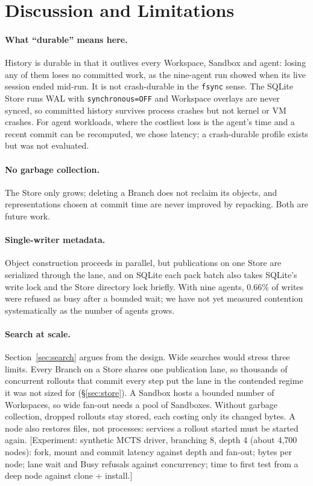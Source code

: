 \documentclass[letterpaper,twocolumn,10pt]{article}
\newif\ifdraft\drafttrue
\newcommand{\dnote}[1]{\ifdraft\textcolor{red!70!black}{\textsf{\small[#1]}}\fi}
\newcommand{\ws}{Workspace}
\begin{document}
\section{Discussion and Limitations}
\label{sec:discussion}

\paragraph{What ``durable'' means here.}\label{sec:durable} History is
durable in that it outlives every \ws{}, Sandbox and agent: losing any of
them loses no committed work, as the nine-agent run showed when its live
session ended mid-run. It is not crash-durable in the \texttt{fsync} sense.
The SQLite Store runs WAL with \texttt{synchronous=OFF} and \ws{} overlays
are never synced, so committed history survives process crashes but not
kernel or VM crashes. For agent workloads, where the costliest loss is the
agent's time and a recent commit can be recomputed, we chose latency; a
crash-durable profile exists but was not evaluated.

\paragraph{No garbage collection.} The Store only grows; deleting a Branch
does not reclaim its objects, and representations chosen at commit time are
never improved by repacking. Both are future work.

\paragraph{Single-writer metadata.} Object construction proceeds in
parallel, but publications on one Store are serialized through the lane,
and on SQLite each pack batch also takes SQLite's write lock and the Store
directory lock briefly. With
nine agents, 0.66\% of writes were refused as busy after a bounded wait; we
have not yet measured contention systematically as the number of agents
grows.

\paragraph{Search at scale.} Section~\ref{sec:search} argues from the
design. Wide searches would stress three limits. Every Branch on a Store
shares one publication lane, so thousands of concurrent rollouts that commit
every step put the lane in the contended regime it was not sized for
(\S\ref{sec:store}). A Sandbox hosts a bounded number of \ws{}s, so wide
fan-out needs a pool of Sandboxes. Without garbage collection, dropped
rollouts stay stored, each costing only its changed bytes. A node also
restores files, not processes: services a rollout started must be started
again. \dnote{Experiment: synthetic MCTS driver, branching 8, depth 4
(about 4,700 nodes): fork, mount and commit latency against depth and
fan-out; bytes per node; lane wait and Busy refusals against concurrency;
time to first test from a deep node against clone + install.}
\end{document}

